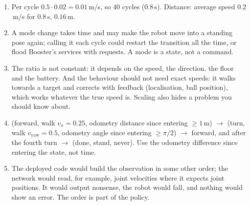 \begin{enumerate}[label=\textbf{\ansnum.\arabic*}]
  \item Per cycle $0.5\cdot0.02=0.01$\,m/s, so $40$ cycles ($0.8$\,s). Distance: average speed $0.2$\,m/s for $0.8$\,s, $0.16$\,m.
  \item A mode change takes time and may make the robot move into a standing pose again; calling it each cycle could restart the transition all the time, or flood Booster's services with requests. A mode is a state, not a command.
  \item The ratio is not constant: it depends on the speed, the direction, the floor and the battery. And the behaviour should not need exact speeds: it walks towards a target and corrects with feedback (localisation, ball position), which works whatever the true speed is. Scaling also hides a problem you should know about.
  \item (forward, walk $v_x=0.25$, odometry distance since entering $\ge1$\,m) $\rightarrow$ (turn, walk $v_{\text{yaw}}=0.5$, odometry angle since entering $\ge\pi/2$) $\rightarrow$ forward, and after the fourth turn $\rightarrow$ (done, stand, never). Use the odometry difference since entering the state, not time.
  \item The deployed code would build the observation in some other order; the network would read, for example, joint velocities where it expects joint positions. It would output nonsense, the robot would fall, and nothing would show an error. The order is part of the policy.
\end{enumerate}
